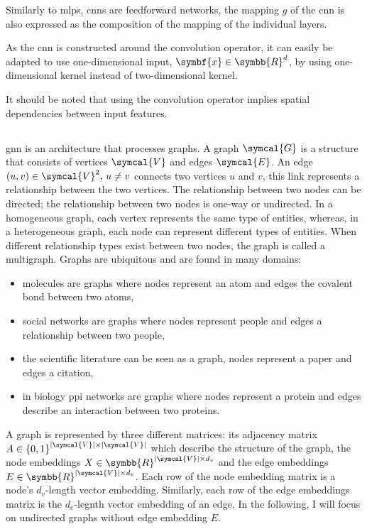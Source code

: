 \documentclass[../main.tex]{subfiles}
\begin{document}
	 Similarly to \glspl{mlp}, \glspl{cnn} are feedforward networks, the mapping \(g\) of the \gls{cnn} is also expressed as the composition of the mapping of the individual layers.

	 As the \gls{cnn} is constructed around the convolution operator, it can easily be adapted to use one-dimensional input, \(\symbf{x} \in \symbb{R}^d\), by using one-dimensional kernel instead of two-dimensional kernel.

	 It should be noted that using the convolution operator implies spatial dependencies between input features.

 \subsection{}
	 \Gls{gnn} is an architecture that processes graphs.
	 A graph \(\symcal{G}\) is a structure that consists of vertices \(\symcal{V}\) and edges \(\symcal{E}\).
	 An edge \(\left(u,v\right) \in \symcal{V}^2,\, u\neq v\) connects two vertices \(u\) and \(v\), this link represents a relationship between the two vertices.
	 The relationship between two nodes can be directed; the relationship between two nodes is one-way or undirected.
	 In a homogeneous graph, each vertex represents the same type of entities, whereas, in a heterogeneous graph, each node can represent different types of entities.
	 When different relationship types exist between two nodes, the graph is called a multigraph.
	 Graphs are ubiquitous and are found in many domains:
	 \begin{itemize}[nosep]
		 \item molecules are graphs where nodes represent an atom and edges the covalent bond between two atoms,
		 \item social networks are graphs where nodes represent people and edges a relationship between two people,
		 \item the scientific literature can be seen as a graph, nodes represent a paper and edges a citation,
		 \item in biology \gls{ppi} networks are graphs where nodes represent a protein and edges describe an interaction between two proteins.
	 \end{itemize}

	 A graph is represented by three different matrices: its adjacency matrix \(A \in {\left\{0,1\right\}}^{\left|\symcal{V}\right| \times \left|\symcal{V}\right|}\) which describe the structure of the graph, the node embeddings \(X \in \symbb{R}^{\left|\symcal{V}\right| \times d_v}\) and the edge embeddings \(E \in \symbb{R}^{\left|\symcal{V}\right| \times d_e}\).
	 Each row of the node embedding matrix is a node's \(d_v\)-length vector embedding.
	 Similarly, each row of the edge embeddings matrix is the \(d_e\)-legnth vector embedding of an edge.
	 In the following, I will focus on undirected graphs without edge embedding \(E\).
\end{document}
